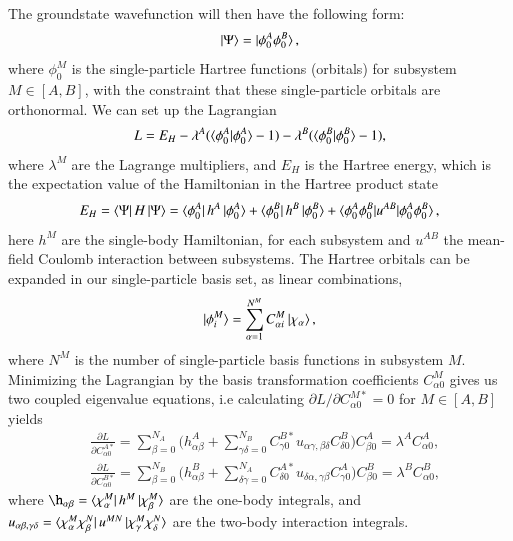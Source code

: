 \documentclass{subfiles}
\begin{document}
The groundstate wavefunction will then have the following form:
\begin{align*}
    \ket{\Psi} = \ket{\phi^A_0\phi^B_0},
\end{align*}
where $\phi_0^M$ is the single-particle Hartree functions (orbitals) for subsystem $M\in[A,B]$, with the constraint that these single-particle orbitals are orthonormal. We can set up the Lagrangian
\begin{align*}
    L = E_H - \lambda^A(\braket{\phi^A_0|\phi^A_0} - 1) - \lambda^B(\braket{\phi^B_0|\phi^B_0} - 1),
\end{align*}
where $\lambda^M$ are the Lagrange multipliers, and $E_H$ is the Hartree energy, which is the expectation value of the Hamiltonian in the Hartree product state
\begin{align*}
    E_H = \bra{\Psi}H\ket{\Psi} = \bra{\phi^A_0}h^A\ket{\phi^A_0} + \bra{\phi^B_0}h^B\ket{\phi^B_0} + \braket{\phi^A_0\phi^B_0|u^{AB}|\phi^A_0\phi^B_0},
\end{align*}
here $h^M$ are the single-body Hamiltonian, for each subsystem and $u^{AB}$ the mean-field Coulomb interaction between subsystems. The Hartree orbitals can be expanded in our single-particle basis set, as linear combinations, 
\begin{align*}
    \ket{\phi^M_i} = \sum_{\alpha=1}^{N^M} C^M_{\alpha i}\ket{\chi_\alpha},
\end{align*}
where $N^M$ is the number of single-particle basis functions in subsystem $M$. Minimizing the Lagrangian by the basis transformation coefficients $C_{\alpha 0}^M$ gives us two coupled eigenvalue equations, i.e calculating $\partial L/\partial C_{\alpha 0}^{M*} = 0$ for $M\in[A,B]$ yields
\begin{align}
    &\frac{\partial L}{\partial C_{\alpha 0}^{A*}}  = \sum_{\beta=0}^{N_A}\big(h_{\alpha\beta}^A + \sum^{N_B}_{\gamma\delta=0}C^{B*}_{\gamma0} u_{\alpha\gamma,\beta\delta}C^B_{\delta0} \big)C^A_{\beta 0}  = \lambda^AC^A_{\alpha 0},\nonumber \\
    &\frac{\partial L}{\partial C_{\alpha 0}^{B*}}  = \sum_{\beta=0}^{N_B}\big(h_{\alpha\beta}^B + \sum^{N_A}_{\delta\gamma=0}C^{A*}_{\delta0} u_{\delta\alpha,\gamma\beta}C^A_{\gamma0} \big)C^B_{\beta 0}  = \lambda^BC^B_{\alpha 0}\label{eq:bipartite_hartree},
\end{align}
where $\h_{\alpha\beta} = \bra{\chi_\alpha^M}h^M\ket{\chi_\beta^M}$ are the one-body integrals, and $u_{\alpha\beta,\gamma\delta} = \bra{\chi_\alpha^M\chi_\beta^N}u^{MN}\ket{\chi_\gamma^M\chi_\delta^N}$ are the two-body interaction integrals.  \\
\end{document}
